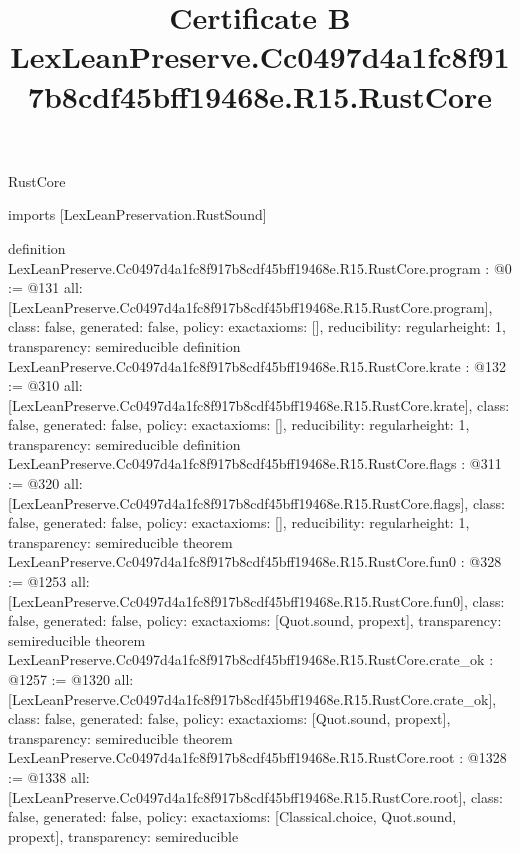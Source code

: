 \begin{lexlean}{RustCore}
\title{Certificate B LexLeanPreserve.Cc0497d4a1fc8f917b8cdf45bff19468e.R15.RustCore}
\begin{coremodule}
imports [LexLeanPreservation.RustSound]

definition LexLeanPreserve.Cc0497d4a1fc8f917b8cdf45bff19468e.R15.RustCore.program : @0 := @131 {
  all: [LexLeanPreserve.Cc0497d4a1fc8f917b8cdf45bff19468e.R15.RustCore.program],
  class: false,
  generated: false,
  policy: exact{axioms: []},
  reducibility: regular{height: 1},
  transparency: semireducible
}
definition LexLeanPreserve.Cc0497d4a1fc8f917b8cdf45bff19468e.R15.RustCore.krate : @132 := @310 {
  all: [LexLeanPreserve.Cc0497d4a1fc8f917b8cdf45bff19468e.R15.RustCore.krate],
  class: false,
  generated: false,
  policy: exact{axioms: []},
  reducibility: regular{height: 1},
  transparency: semireducible
}
definition LexLeanPreserve.Cc0497d4a1fc8f917b8cdf45bff19468e.R15.RustCore.flags : @311 := @320 {
  all: [LexLeanPreserve.Cc0497d4a1fc8f917b8cdf45bff19468e.R15.RustCore.flags],
  class: false,
  generated: false,
  policy: exact{axioms: []},
  reducibility: regular{height: 1},
  transparency: semireducible
}
theorem LexLeanPreserve.Cc0497d4a1fc8f917b8cdf45bff19468e.R15.RustCore.fun0 : @328 := @1253 {
  all: [LexLeanPreserve.Cc0497d4a1fc8f917b8cdf45bff19468e.R15.RustCore.fun0],
  class: false,
  generated: false,
  policy: exact{axioms: [Quot.sound, propext]},
  transparency: semireducible
}
theorem LexLeanPreserve.Cc0497d4a1fc8f917b8cdf45bff19468e.R15.RustCore.crate_ok : @1257 := @1320 {
  all: [LexLeanPreserve.Cc0497d4a1fc8f917b8cdf45bff19468e.R15.RustCore.crate_ok],
  class: false,
  generated: false,
  policy: exact{axioms: [Quot.sound, propext]},
  transparency: semireducible
}
theorem LexLeanPreserve.Cc0497d4a1fc8f917b8cdf45bff19468e.R15.RustCore.root : @1328 := @1338 {
  all: [LexLeanPreserve.Cc0497d4a1fc8f917b8cdf45bff19468e.R15.RustCore.root],
  class: false,
  generated: false,
  policy: exact{axioms: [Classical.choice, Quot.sound, propext]},
  transparency: semireducible
}


\end{coremodule}
\end{lexlean}
